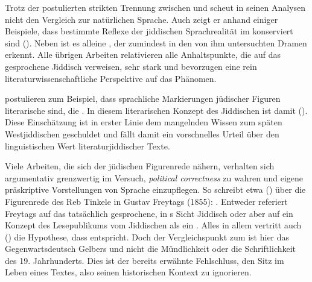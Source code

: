 Trotz der postulierten strikten Trennung zwischen  und  scheut \cite{Richter1995} in seinen Analysen nicht den Vergleich zur natürlichen Sprache. Auch zeigt er anhand einiger Beispiele, dass bestimmte Reflexe der jiddischen Sprachrealität im \hai{{\LiJi}} konserviert sind (\citealt[95–113]{Richter1995}). Neben \cite{Richter1995} ist es alleine \cite{Jenzsch1974}, der zumindest in den von ihm untersuchten Dramen  erkennt. Alle übrigen Arbeiten relativieren alle Anhaltspunkte, die auf das gesprochene Jiddisch verweisen, sehr stark und bevorzugen eine rein literaturwissenschaftliche Perspektive auf das Phänomen.

\cite[118]{FischerBayerd2008} postulieren zum Beispiel, dass sprachliche Markierungen jüdischer Figuren literarische  sind, die . In diesem literarischen Konzept des Jiddischen ist damit  (\citealt[118]{FischerBayerd2008}). Diese Einschätzung ist in erster Linie dem mangelnden Wissen zum späten Westjiddischen geschuldet und fällt damit ein vorschnelles Urteil über den linguistischen Wert literaturjiddischer Texte. 

Viele Arbeiten, die sich der jüdischen Figurenrede nähern, verhalten sich argumentativ grenzwertig im Versuch, \textit{political correctness} zu wahren und eigene präskriptive Vorstellungen von Sprache einzupflegen. So schreibt etwa \citeauthor{Gelber1986} (\citeyear[167]{Gelber1986}) über die Figurenrede des Reb Tinkele in Gustav Freytags  (1855): . Entweder referiert Freytags \hai{{\LiJi}} auf das tatsächlich gesprochene, in \citeauthor{Gelber1986}s Sicht  Jiddisch oder aber auf ein Konzept des Lesepublikums vom Jiddischen als ein . Alles in allem vertritt auch \citeauthor{Gelber1986} (\citeyear[166]{Gelber1986}) die Hypothese, dass \hai{{\LiJi}}  entspricht. Doch der Vergleichspunkt zum \hai{{\LiJi}} ist hier das Gegenwartsdeutsch Gelbers und nicht die Mündlichkeit oder die Schriftlichkeit des 19. Jahrhunderts. Dies ist der bereits erwähnte Fehlschluss, den Sitz im Leben eines Textes, also seinen historischen Kontext zu ignorieren.

